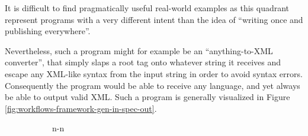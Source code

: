 \documentclass{scrreprt}
\begin{document}
It is difficult to find pragmatically useful real-world examples as this quadrant represent programs with a very different intent than the idea of ``writing once and publishing everywhere''.

Nevertheless, such a program might for example be an ``anything-to-XML converter'', that simply slaps a root tag onto whatever string it receives and escape any XML-like syntax from the input string in order to avoid syntax errors. Consequently the program would be able to receive any language, and yet always be able to output valid XML. Such a program is generally visualized in Figure \ref{fig:workflows-framework-gen-in-spec-out}.





\begin{figure}[h]
\begin{subfigure}{.25\textwidth}

  \centering


  \caption{n-n}
  \label{fig:workflows-framework-gen-in-gen-out}

\end{subfigure}%
\begin{subfigure}{.25\textwidth}

  \centering

\end{subfigure}
\end{figure}
\end{document}
